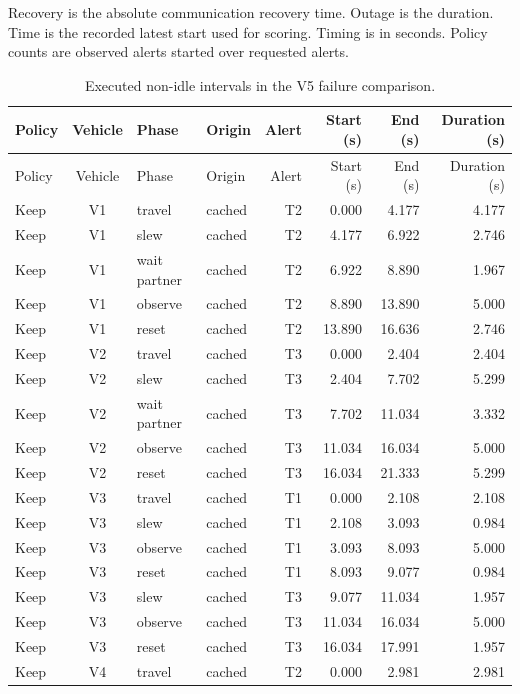 \noindent Recovery is the absolute communication recovery time. Outage is the duration. Time is the recorded latest start used for scoring. Timing is in seconds. Policy counts are observed alerts started over requested alerts.\par
{}
\begin{longtable}{@{}lcllrrrr@{}}
\caption{Executed non-idle intervals in the V5 failure comparison.}\\
\toprule
Policy & Vehicle & Phase & Origin & Alert & Start (s) & End (s) & Duration (s)\\
\midrule
\endfirsthead
\toprule
Policy & Vehicle & Phase & Origin & Alert & Start (s) & End (s) & Duration (s)\\
\midrule
\endhead
\bottomrule
\endlastfoot
Keep & V1 & travel & cached & T2 & 0.000 & 4.177 & 4.177\\
Keep & V1 & slew & cached & T2 & 4.177 & 6.922 & 2.746\\
Keep & V1 & wait partner & cached & T2 & 6.922 & 8.890 & 1.967\\
Keep & V1 & observe & cached & T2 & 8.890 & 13.890 & 5.000\\
Keep & V1 & reset & cached & T2 & 13.890 & 16.636 & 2.746\\
Keep & V2 & travel & cached & T3 & 0.000 & 2.404 & 2.404\\
Keep & V2 & slew & cached & T3 & 2.404 & 7.702 & 5.299\\
Keep & V2 & wait partner & cached & T3 & 7.702 & 11.034 & 3.332\\
Keep & V2 & observe & cached & T3 & 11.034 & 16.034 & 5.000\\
Keep & V2 & reset & cached & T3 & 16.034 & 21.333 & 5.299\\
Keep & V3 & travel & cached & T1 & 0.000 & 2.108 & 2.108\\
Keep & V3 & slew & cached & T1 & 2.108 & 3.093 & 0.984\\
Keep & V3 & observe & cached & T1 & 3.093 & 8.093 & 5.000\\
Keep & V3 & reset & cached & T1 & 8.093 & 9.077 & 0.984\\
Keep & V3 & slew & cached & T3 & 9.077 & 11.034 & 1.957\\
Keep & V3 & observe & cached & T3 & 11.034 & 16.034 & 5.000\\
Keep & V3 & reset & cached & T3 & 16.034 & 17.991 & 1.957\\
Keep & V4 & travel & cached & T2 & 0.000 & 2.981 & 2.981\\

\end{longtable}
